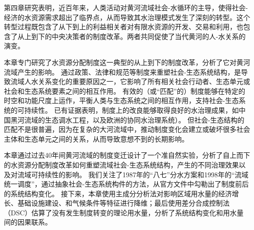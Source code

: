 第四章研究表明，近百年来，人类活动对黄河流域社会-水循环的主导，使得社会-经济的水资源需求超出了临界点，从而导致其水治理模式发生了深刻的转型。这个转型过程既包含了从下到上的利益相关者对有限水资源的开发、交易和利用，也包含了从上到下的中央决策者的制度改革。两者共同促使了当代黄河的人-水关系的演变。

本章专门研究了水资源分配制度这一典型的从上到下的制度改革，分析了它对黄河流域产生的影响。
通过政策、法律和规范等制度来重塑社会-生态系统结构，是导致流域人水关系变化的重要原因之一，它影响了所有相关社会行动者、生态单元或社会和生态系统要素之间的相互作用\cite{lien2020, bodin2017b}。
有效的（或“匹配”的）制度能够在特定的时空和功能尺度上运作，平衡人类与生态系统之间的相互作用，支持社会-生态系统的可持续性\cite{epstein2015, wang2019d}。
已有证据表明，制度上的改良能够取得良好的水治理成果，如中国黑河流域的生态调水工程\cite{wang2019d}，以及欧洲的协同水治理系统\cite{green2013}）。
但社会-生态结构的匹配不是很普遍，因为在复杂的大河流域中，推动制度变化会建立或破坏很多社会主体和生态单元之间的关系，从而导致意想不到的长期影响。

本章通过过去40年间黄河流域的制度变迁设计了一个准自然实验，分析了自上而下的水资源分配制度改革如何重塑流域社会-生态系统结构，产生的不同治理效果以及对流域可持续性的影响。
我们关注了1987年的“八七”分水方案和1998年的“流域统一调度”，通过抽象社会-生态系统构件的方法，从官方文件中勾勒出了制度前后的系统结构变化。
接下来，本章使用主成分分析法对影响区域用水量的经济增长、基础设施建设、和气候条件等特征进行降维；最后使用差分合成控制法（DSC）\cite{arkhangelsky2021}估算了没有发生制度转变的理论用水量，分析了系统结构变化和用水量间的因果联系。
